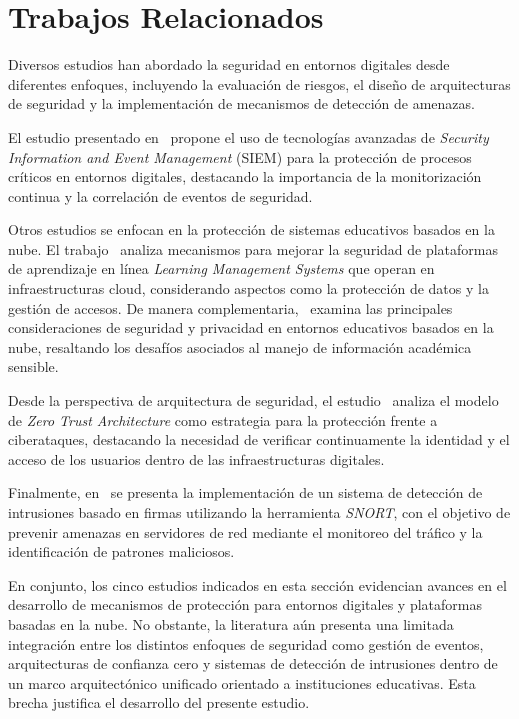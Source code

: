 \section{Trabajos Relacionados}\label{sec:Trabajos-Relacionados}

Diversos estudios han abordado la seguridad en entornos digitales desde diferentes enfoques, incluyendo la evaluación de 
riesgos, el diseño de arquitecturas de seguridad y la implementación de mecanismos de detección de amenazas.

El estudio presentado en~\cite{Coppolino2022SIEMEHealth} propone el uso de tecnologías avanzadas de \textit{Security Information 
and Event Management} (SIEM) para la protección de procesos críticos en entornos digitales, destacando la importancia de la 
monitorización continua y la correlación de eventos de seguridad.

Otros estudios se enfocan en la protección de sistemas educativos basados en la nube. El trabajo~\cite{Chatterjee2023CloudLMS} 
analiza mecanismos para mejorar la seguridad de plataformas de aprendizaje en línea \textit{Learning Management
Systems} que operan en infraestructuras cloud, considerando aspectos como la protección de datos y la gestión de accesos. 
De manera complementaria,~\cite{Vashishth2024CloudEducationSecurity} examina las principales consideraciones de seguridad y 
privacidad en entornos educativos basados en la nube, resaltando los desafíos asociados al manejo de información académica sensible.

Desde la perspectiva de arquitectura de seguridad, el estudio~\cite{Stojalowski2024ZeroTrust} analiza el modelo de 
\textit{Zero Trust Architecture} como estrategia para la protección frente a ciberataques, destacando la necesidad 
de verificar continuamente la identidad y el acceso de los usuarios dentro de las infraestructuras digitales.

Finalmente, en~\cite{Pramudya2022SnortIDS} se presenta la implementación de un sistema de detección de intrusiones basado en 
firmas utilizando la herramienta \textit{SNORT}, con el objetivo de prevenir amenazas en servidores de red mediante el monitoreo 
del tráfico y la identificación de patrones maliciosos.

En conjunto, los cinco estudios indicados en esta sección evidencian avances en el desarrollo de mecanismos de 
protección para entornos digitales y plataformas basadas en la nube. No obstante, la literatura aún presenta una limitada 
integración entre los distintos enfoques de seguridad como gestión de eventos, arquitecturas de confianza cero y sistemas de 
detección de intrusiones dentro de un marco arquitectónico unificado orientado a instituciones educativas. Esta brecha justifica 
el desarrollo del presente estudio.